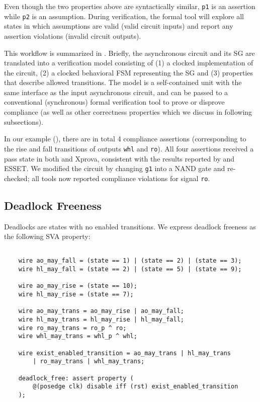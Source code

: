 Even though the two properties above are syntactically similar, \texttt{p1} is
an assertion while \texttt{p2} is an assumption. During verification, the
formal tool will explore all states in which assumptions are valid (valid
circuit inputs) and report any assertion violations (invalid circuit outputs).

\newpage

This workflow is summarized in . Briefly, the asynchronous
circuit and its SG are translated into a verification model consisting of (1)
a clocked implementation of the circuit, (2) a clocked behavioral FSM
representing the SG and (3) properties that describe allowed transitions. The
model is a self-contained unit with the same interface as the input
asynchronous circuit, and can be passed to a conventional (synchronous) formal
verification tool to prove or disprove compliance (as well as other
correctness properties which we discuss in following subsections).

In our example (), there are in total 4 compliance
assertions (corresponding to the rise and fall transitions of outputs
\texttt{whl} and \texttt{ro}). All four assertions received a pass state in
both \ind{} and Xprova, consistent with the results reported by \mpsat{} and
ESSET. We modified the circuit by changing \texttt{g1} into a NAND gate and
re-checked; all tools now reported compliance violations for signal
\texttt{ro}.

\vspace{0.2cm}

\subsection{Deadlock Freeness}
\label{subsec:deadlock_freeness}

Deadlocks are states with no enabled transitions. We express deadlock freeness
as the following SVA property:

\vspace{0.2cm}

\begin{tcolorbox}[frame hidden,interior hidden,boxsep=0pt,boxrule=1pt]
	\footnotesize
	\begin{verbatim}

	wire ao_may_fall = (state == 1) | (state == 2) | (state == 3);
	wire hl_may_fall = (state == 2) | (state == 5) | (state == 9);

	wire ao_may_rise = (state == 10);
	wire hl_may_rise = (state == 7);

	wire ao_may_trans = ao_may_rise | ao_may_fall;
	wire hl_may_trans = hl_may_rise | hl_may_fall;
	wire ro_may_trans = ro_p ^ ro;
	wire whl_may_trans = whl_p ^ whl;

	wire exist_enabled_transition = ao_may_trans | hl_may_trans
	    | ro_may_trans | whl_may_trans;

	deadlock_free: assert property (
	    @(posedge clk) disable iff (rst) exist_enabled_transition
	);
	\end{verbatim}
\end{tcolorbox}

